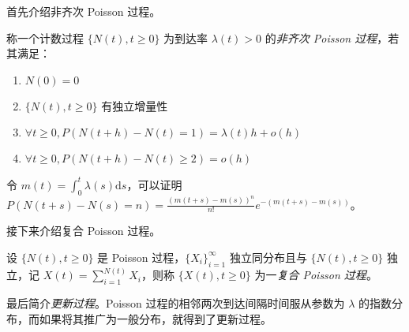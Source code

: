 \documentclass[../main.tex]{subfiles}
\begin{document}
首先介绍非齐次 Poisson 过程。

\begin{definition}\label{def:6.4.1}
    称一个计数过程 $\{N(t),t\geq0\}$ 为到达率 $\lambda(t)>0$ 的\emph{非齐次 Poisson 过程}，若其满足：
    \begin{enumerate}
        \item $N(0)=0$
        \item $\{N(t),t\geq0\}$ 有独立增量性
        \item $\forall t\geq0,P(N(t+h)-N(t)=1)=\lambda(t)h+o(h)$
        \item $\forall t\geq0,P(N(t+h)-N(t)\geq2)=o(h)$
    \end{enumerate}
\end{definition}

令 $m(t)=\int_0^t\lambda(s)\mathrm ds$，可以证明 $P(N(t+s)-N(s)=n)=\frac{(m(t+s)-m(s))^n}{n!}e^{-(m(t+s)-m(s))}$。

接下来介绍复合 Poisson 过程。

\begin{definition}\label{def:6.4.2}
    设 $\{N(t),t\geq0\}$ 是 Poisson 过程，$\{X_i\}_{i=1}^\infty$ 独立同分布且与 $\{N(t),t\geq0\}$ 独立，记 $X(t)=\sum_{i=1}^{N(t)}X_i$，则称 $\{X(t),t\geq0\}$ 为一\emph{复合 Poisson 过程}。
\end{definition}

最后简介\emph{更新过程}。Poisson 过程的相邻两次到达间隔时间服从参数为 $\lambda$ 的指数分布，而如果将其推广为一般分布，就得到了更新过程。
\end{document}
